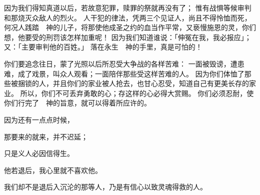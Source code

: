 {\par }{\PP {}因为我们得知真道以后，若故意犯罪，赎罪的祭就再没有了；
惟有战惧等候审判和那烧灭众敌人的烈火。
人干犯{}的律法，凭两三个见证人，尚且不得怜恤而死，
何况人践踏　神的儿子，将那使他成圣之约的血当作平常，又亵慢施恩的{}灵，你们想，他要受的刑罚该怎样加重呢！
因为我们知道谁说：「伸冤在我，我必报应」；又{}：「主要审判他的百姓。」
落在永生　神的手里，真是可怕的！
\par }{\PP {}你们要追念往日，蒙了光照以后所忍受大争战的各样苦难：
一面被毁谤，遭患难，成了戏景，叫众人观看；一面陪伴那些受这样苦难的人。
因为你们体恤了那些被捆锁的人，并且你们的家业被人抢去，也甘心忍受，知道自己有更美长存的家业。
所以，你们不可丢弃勇敢的心；存这样的心必得大赏赐。
你们必须忍耐，使你们行完了　神的旨意，就可以得着所应许的。
\par }{\Q {}因为还有一点点时候，
\par }{\Q 那要来的就来，并不迟延；
\par }{\Q {}只是义人必因信得生。
\par }{\Q 他若退后，我心里就不喜欢他。
\par }{\PP {}我们却不是退后入沉沦的那等人，乃是有信心以致灵魂得救的人。

}
